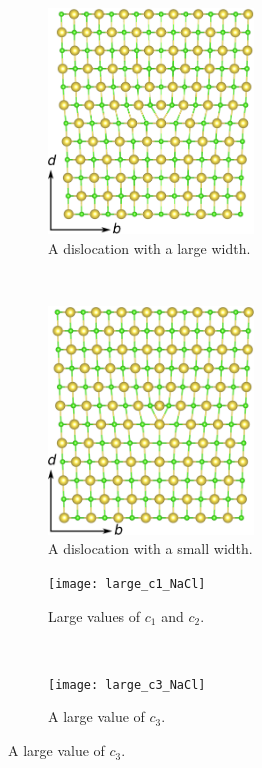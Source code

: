 \begin{figure}
\centering

    \begin{subfigure}{0.4\textwidth}
    \centering
    \includegraphics[width=0.6\textwidth]{wide_NaCl}
    \caption{A dislocation with a large width.}
    \end{subfigure}
    ~
    \begin{subfigure}{0.4\textwidth}
    \centering
    \includegraphics[width=0.6\textwidth]{narrow_NaCl}
    \caption{A dislocation with a small width.}
    \end{subfigure}

	\begin{subfigure}{0.4\textwidth}
	\centering
    \texttt{[image: large\_c1\_NaCl]}
    \caption{Large values of $c_1$ and $c_2$.}
	\end{subfigure}
    ~
	\begin{subfigure}{0.4\textwidth}
	\centering
    \texttt{[image: large\_c3\_NaCl]}
    \caption{A large value of $c_3$.}
	\end{subfigure}


\end{figure}
